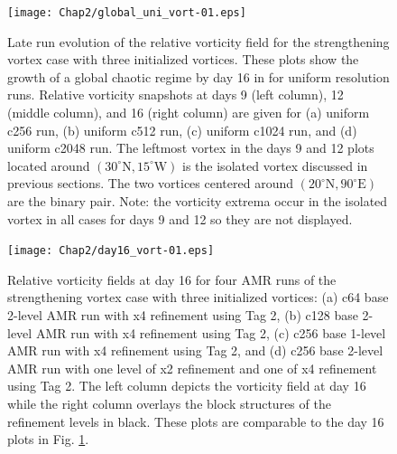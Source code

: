 \begin{figure}
   \centerline{%
   \noindent
   \texttt{[image: Chap2/global\_uni\_vort-01.eps]}}
   \caption{Late run evolution of the relative vorticity field for the 
   strengthening vortex case with three initialized vortices. These plots show
   the growth of a global chaotic regime by day 16 in for uniform resolution
   runs. Relative vorticity snapshots at days 9 (left column), 12 (middle column), 
   and 16 (right column) are given for
   (a) uniform c256 run, (b) uniform c512 run, (c) uniform c1024 run, and
   (d) uniform c2048 run. The leftmost vortex in the days 9 and 12 plots
   located around $(30^\circ \mathrm{N}, 15^\circ \mathrm{W})$ is the isolated
   vortex discussed in previous sections. The two vortices centered around
   $(20^\circ \mathrm{N}, 90^\circ \mathrm{E})$ are the binary pair. Note: the
   vorticity extrema occur in the isolated vortex in all cases for days 9 and 12 so they are 
   not displayed.}
   \label{fig:threevort_uni}
\end{figure}
\begin{figure}
   \centerline{%
   \noindent
   \texttt{[image: Chap2/day16\_vort-01.eps]}}
   \caption{Relative vorticity fields at day 16 for four AMR runs of the strengthening
   vortex case with three initialized vortices: 
   (a) c64 base 2-level AMR run with x4 refinement using Tag 2,
   (b) c128 base 2-level AMR run with x4 refinement using Tag 2,
   (c) c256 base 1-level AMR run with x4 refinement using Tag 2,
   and (d) c256 base 2-level AMR run with one level of x2 refinement 
   and one of x4 refinement using Tag 2. The left column depicts the vorticity 
   field at day 16 while the right column overlays
   the block structures of the refinement levels in black. These plots
   are comparable to the day 16 plots in Fig. \ref{fig:threevort_uni}.
   }
   \label{fig:vort_amr_day16}
\end{figure}

